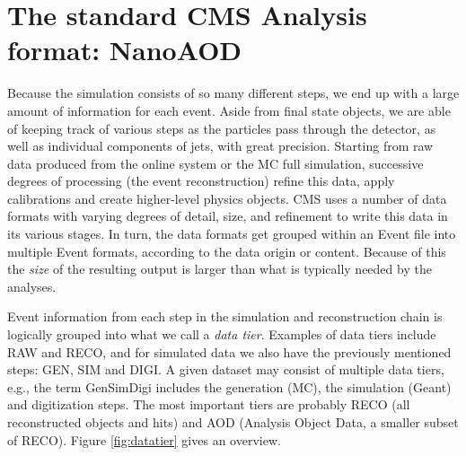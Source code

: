 \section{The standard CMS Analysis format: NanoAOD}\label{sec:nanoaod}

Because the simulation consists of so many different steps, we end up with a large amount of information for each event. Aside from final state objects, we are able of keeping track of various steps as the particles pass through the detector, as well as individual components of jets, with great precision. Starting from raw data produced from the online system or the MC full simulation, successive degrees of processing (the event reconstruction) refine this data, apply calibrations and create higher-level physics objects. CMS uses a number of data formats with varying degrees of detail, size, and refinement to write this data in its various stages. In turn, the data formats get grouped within an Event file into multiple Event formats, according to the data origin or content. Because of this the \emph{size} of the resulting output is larger than what is typically needed by the analyses.

Event information from each step in the simulation and reconstruction chain is logically grouped into what we call a \emph{data tier}. Examples of data tiers include RAW and RECO, and for simulated data we also have the previously mentioned steps: GEN, SIM and DIGI. A given dataset may consist of multiple data tiers, e.g., the term GenSimDigi includes the generation (MC), the simulation (Geant) and digitization steps. The most important tiers are probably RECO (all reconstructed objects and hits) and AOD (Analysis Object Data, a smaller subset of RECO). Figure \ref{fig:datatier} gives an overview. 

